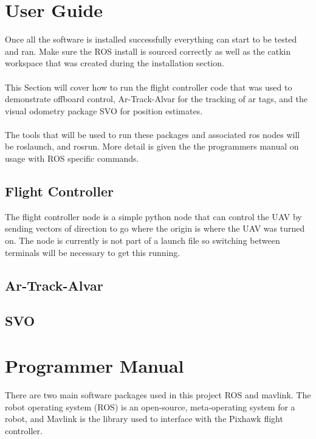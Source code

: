 \section{User Guide}
Once all the software is installed successfully everything can start to be tested and ran. Make sure the ROS install is sourced correctly as well as the catkin workspace that was created during the installation section.\\
\\
This Section will cover how to run the flight controller code that was used to demonstrate offboard control, Ar-Track-Alvar for the tracking of ar tags, and the visual odometry package SVO for position estimates.\\
\\
The tools that will be used to run these packages and associated ros nodes will be roslaunch, and rosrun. More detail is given the the programmers manual on usage with ROS specific commands. 
\subsection{Flight Controller}
The flight controller node is a simple python node that can control the UAV by sending vectors of direction to go where the origin is where the UAV was turned on. The node is currently is not part of a launch file so switching between terminals will be necessary to get this running.
\subsection{Ar-Track-Alvar}
\subsection{SVO}

\section{Programmer Manual}
There are two main software packages used in this project ROS and mavlink. The robot operating system (ROS) is an open-source, meta-operating system for a robot, and Mavlink is the library used to interface with the Pixhawk flight controller.
